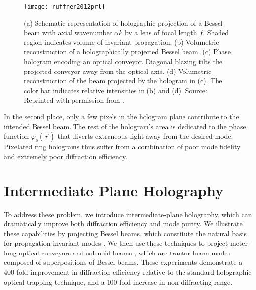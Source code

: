 \begin{figure}[t!]
  \centering
  \texttt{[image: ruffner2012prl]}
  \caption{(a) Schematic representation of holographic projection of a Bessel beam with axial wavenumber $\alpha k$ by a lens of focal length $f$. Shaded region indicates volume of invariant propagation. (b) Volumetric reconstruction of a holographically projected Bessel beam. (c) Phase hologram encoding an optical conveyor. Diagonal blazing tilts the projected conveyor away from the optical axis. (d) Volumetric reconstruction of the beam projected by the hologram in (c). The color bar indicates relative intensities in (b) and (d). Source: Reprinted with permission from \cite{ruffner12a}.}
  \label{fig:previous bessel hologram}
\end{figure}


In the second place, only a few pixels in
the hologram plane contribute to the intended Bessel beam.
The rest of the hologram's area is dedicated to the
phase function $\varphi_0(\vec{r})$ that diverts
extraneous light away from the desired mode.
Pixelated ring holograms thus suffer from a combination of
poor mode fidelity and extremely poor diffraction efficiency.






\section{Intermediate Plane Holography}


To address these problem, we introduce intermediate-plane
holography, which can dramatically improve
both diffraction efficiency and mode purity.
We illustrate these capabilities by projecting
Bessel beams, which constitute 
the natural basis for propagation-invariant modes \cite{durnin87,durnin87a}.
We then use these techniques to project meter-long
optical conveyors \cite{cizmar05,ruffner12a,ruffner14}
and solenoid beams \cite{lee10,yevick16}, 
which are tractor-beam modes composed of superpositions of Bessel
beams.
These experiments demonstrate a \num{400}-fold improvement in 
diffraction efficiency relative to the standard holographic optical
trapping technique, and a
\num{100}-fold increase in non-diffracting range.



